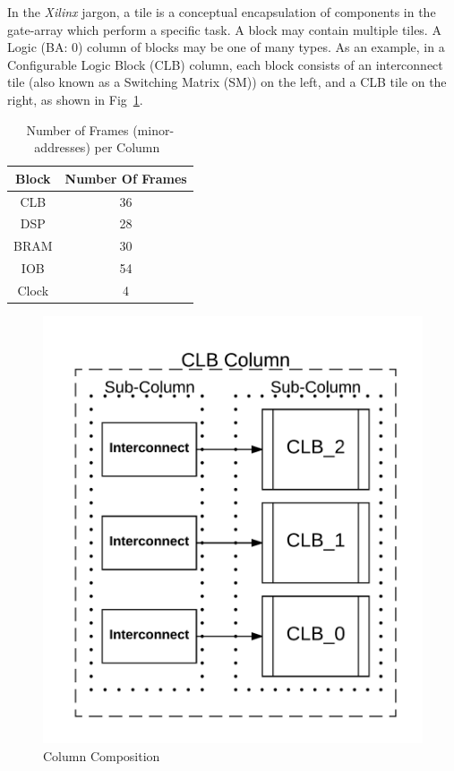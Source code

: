 \documentclass[journal, hidelinks]{IEEEtran}
\begin{document}
In the \textit{Xilinx} jargon, a tile is a conceptual encapsulation of components in the gate-array which perform a specific task.
A block may contain multiple tiles.
A Logic (BA: 0) column of blocks may be one of many types.
As an example, in a Configurable Logic Block (CLB) column, each block consists of an interconnect tile (also known as a Switching Matrix (SM)) on the left, and a CLB tile on the right, as shown in Fig~\ref{fig:column}.
\begin{table}[h]
	\centering
	\caption{Number of Frames (minor-addresses) per Column~\cite{virtex5ConfigGuide}}
	\label{tbl:minorAddressNumbers}
	\begin{tabular}{|c|c|}
		\hline
		Block             & Number Of Frames \\ \hline
		CLB               & 36               \\ \hline
		DSP               & 28               \\ \hline
		BRAM   & 30               \\ \hline
		IOB               & 54               \\ \hline
		Clock             & 4                \\ \hline
	\end{tabular}
\end{table}
\begin{figure}[h]
	\centering
	\includegraphics[width=0.8\linewidth]{Figures/column}
	\caption[Column Composition]{Column Composition}
	\label{fig:column}
\end{figure}
\end{document}
